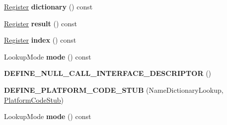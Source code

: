 \begin{DoxyCompactItemize}
\item 
\hyperlink{structv8_1_1internal_1_1_register}{Register} {\bfseries dictionary} () const \hypertarget{classv8_1_1internal_1_1_name_dictionary_lookup_stub_ac861b8263ad2fe6df68e0e9d6fb8b3b7}{}\label{classv8_1_1internal_1_1_name_dictionary_lookup_stub_ac861b8263ad2fe6df68e0e9d6fb8b3b7}

\item 
\hyperlink{structv8_1_1internal_1_1_register}{Register} {\bfseries result} () const \hypertarget{classv8_1_1internal_1_1_name_dictionary_lookup_stub_a2a5e0dc2f0d9b217467de313058274ba}{}\label{classv8_1_1internal_1_1_name_dictionary_lookup_stub_a2a5e0dc2f0d9b217467de313058274ba}

\item 
\hyperlink{structv8_1_1internal_1_1_register}{Register} {\bfseries index} () const \hypertarget{classv8_1_1internal_1_1_name_dictionary_lookup_stub_a09f710557ee64050dd1afb300391839d}{}\label{classv8_1_1internal_1_1_name_dictionary_lookup_stub_a09f710557ee64050dd1afb300391839d}

\item 
Lookup\+Mode {\bfseries mode} () const \hypertarget{classv8_1_1internal_1_1_name_dictionary_lookup_stub_ae1880a8b261f163f4d11a3d3809252ab}{}\label{classv8_1_1internal_1_1_name_dictionary_lookup_stub_ae1880a8b261f163f4d11a3d3809252ab}

\item 
{\bfseries D\+E\+F\+I\+N\+E\+\_\+\+N\+U\+L\+L\+\_\+\+C\+A\+L\+L\+\_\+\+I\+N\+T\+E\+R\+F\+A\+C\+E\+\_\+\+D\+E\+S\+C\+R\+I\+P\+T\+OR} ()\hypertarget{classv8_1_1internal_1_1_name_dictionary_lookup_stub_a56e72757ba3ab8928220e89075ca6848}{}\label{classv8_1_1internal_1_1_name_dictionary_lookup_stub_a56e72757ba3ab8928220e89075ca6848}

\item 
{\bfseries D\+E\+F\+I\+N\+E\+\_\+\+P\+L\+A\+T\+F\+O\+R\+M\+\_\+\+C\+O\+D\+E\+\_\+\+S\+T\+UB} (Name\+Dictionary\+Lookup, \hyperlink{classv8_1_1internal_1_1_platform_code_stub}{Platform\+Code\+Stub})\hypertarget{classv8_1_1internal_1_1_name_dictionary_lookup_stub_a9b6511fda10d2ab14ce9366da895bb71}{}\label{classv8_1_1internal_1_1_name_dictionary_lookup_stub_a9b6511fda10d2ab14ce9366da895bb71}

\item 
Lookup\+Mode {\bfseries mode} () const \hypertarget{classv8_1_1internal_1_1_name_dictionary_lookup_stub_ae1880a8b261f163f4d11a3d3809252ab}{}\label{classv8_1_1internal_1_1_name_dictionary_lookup_stub_ae1880a8b261f163f4d11a3d3809252ab}


\end{DoxyCompactItemize}
